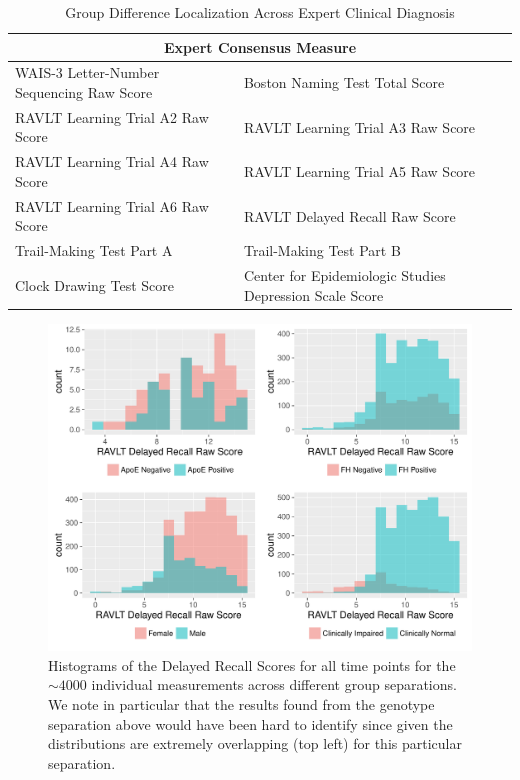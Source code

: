 \begin{table}
	\centering
	\begin{tabular}{p{5.5cm}p{6cm}}
		\toprule
		\multicolumn{2}{c}{\textbf{Expert Consensus Measure}}\\ \midrule \midrule
		WAIS-3 Letter-Number Sequencing Raw Score &
		Boston Naming Test Total Score \\
		RAVLT Learning Trial A2 Raw Score &
		RAVLT Learning Trial A3 Raw Score \\
		RAVLT Learning Trial A4 Raw Score &
		RAVLT Learning Trial A5 Raw Score \\
		RAVLT Learning Trial A6 Raw Score &
		RAVLT Delayed Recall Raw Score \\
		Trail-Making Test Part A &
		Trail-Making Test Part B \\
		Clock Drawing Test Score &
		Center for Epidemiologic Studies Depression Scale Score \\
		\bottomrule
		\bottomrule
	\end{tabular}
	\caption{Group Difference Localization Across Expert Clinical Diagnosis}
	\label{fig:cogcc}
\end{table}

\begin{figure}
\centering
\includegraphics[width=\textwidth]{3_covtraj/figs/DRRAWHists_cogonly.pdf}
\caption[Delayed Recall Histograms]{Histograms of the Delayed Recall Scores for all time points for the $\sim 4000$ individual measurements across different group separations. We note in particular that the results found from the genotype separation above would have been hard to identify since given the distributions are extremely overlapping (top left) for this particular separation.}
\end{figure}
